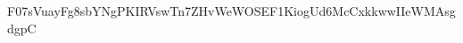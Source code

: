 \documentclass{article}
\begin{document}
F07sVuayFg8sbYNgPKIRVswTn7ZHvWeWOSEF1KiogUd6McCxkkwwIIeWMAsgdgpC%
\end{document}
